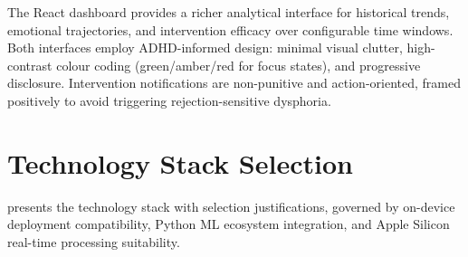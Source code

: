 The React dashboard provides a richer analytical interface for historical trends, emotional trajectories, and intervention efficacy over configurable time windows. Both interfaces employ ADHD-informed design: minimal visual clutter, high-contrast colour coding (green/amber/red for focus states), and progressive disclosure. Intervention notifications are non-punitive and action-oriented, framed positively to avoid triggering rejection-sensitive dysphoria.


\section{Technology Stack Selection}
\label{sec:tech_stack}

 presents the technology stack with selection justifications, governed by on-device deployment compatibility, Python ML ecosystem integration, and Apple Silicon real-time processing suitability.

